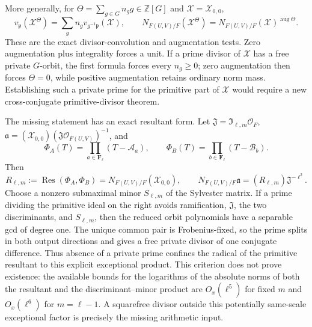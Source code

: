 \documentclass[11pt,oneside]{article}
\theoremstyle{definition}
\theoremstyle{remark}
\newcommand{\Z}{\mathbb Z}
\begin{document}
More generally, for $\Theta=\sum_{g\in G}n_gg\in\Z[G]$ and
$\mathcal X=\mathcal X_{0,0}$,
\begin{equation}
 v_{\mathfrak p}(\mathcal X^\Theta)
 =\sum_gn_gv_{g^{-1}\mathfrak p}(\mathcal X),\qquad
 N_{F(U,V)/F}(\mathcal X^\Theta)
 =N_{F(U,V)/F}(\mathcal X)^{\operatorname{aug}\Theta}.
 \label{crit:eq-signed-kummer-divisor}
\end{equation}
These are the exact divisor-convolution and augmentation tests.  Zero augmentation plus
integrality forces a unit.  If a prime divisor of $\mathcal X$ has a free private
$G$-orbit, the first formula forces every $n_g\ge0$; zero augmentation then forces
$\Theta=0$, while positive augmentation retains ordinary norm mass.  Establishing such a
private prime for the primitive part of $\mathcal X$ would require a new
cross-conjugate primitive-divisor theorem.

The missing statement has an exact resultant form.  Let
$\mathfrak J=\mathfrak I_{\ell,m}\mathcal O_F$,
$\mathfrak a=(\mathcal X_{0,0})(\mathfrak J\mathcal O_{F(U,V)})^{-1}$, and
\[
 \Phi_A(T)=\prod_{a\in\mathbf F_\ell}(T-\mathcal A_a),\qquad
 \Phi_B(T)=\prod_{b\in\mathbf F_\ell}(T-\mathcal B_b).
\]
Then
\begin{equation}
 R_{\ell,m}:=\operatorname{Res}(\Phi_A,\Phi_B)
 =N_{F(U,V)/F}(\mathcal X_{0,0}),\qquad
 N_{F(U,V)/F}\mathfrak a=(R_{\ell,m})\mathfrak J^{-\ell^2}.
 \label{crit:eq-private-prime-resultant}
\end{equation}
Choose a nonzero submaximal minor $S_{\ell,m}$ of the Sylvester matrix.  If a prime dividing
the primitive ideal on the right avoids ramification, $\mathfrak J$, the two discriminants,
and $S_{\ell,m}$, then the reduced orbit polynomials have a separable gcd of degree one.
The unique common pair is Frobenius-fixed, so the prime splits in both output directions and
gives a free private divisor of one conjugate difference.  Thus absence of a private prime
confines the radical of the primitive resultant to this explicit exceptional product.
This criterion does not prove existence: the available bounds for the logarithms of the
absolute norms of both the resultant and the discriminant--minor product are
$O_x(\ell^5)$ for fixed $m$ and $O_x(\ell^6)$ for $m=\ell-1$.  A squarefree divisor outside this potentially
same-scale exceptional factor is precisely the missing arithmetic input.
\end{document}
